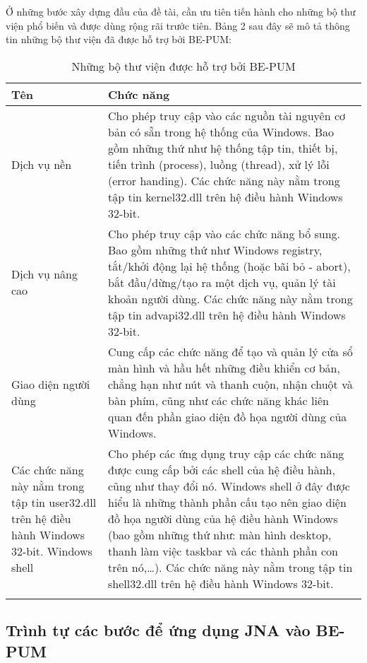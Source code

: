Ở những bước xây dựng đầu của đề tài, cần ưu tiên tiến hành cho những bộ thư viện phổ biến và được dùng rộng rãi trước tiên. Bảng 2 sau đây sẽ mô tả thông tin những bộ thư viện đã được hỗ trợ bởi BE-PUM:


\begin{longtable}{ | m{3cm} | m{12cm} | }
	\hline
Tên & Chức năng\\
	\hline
	\hline
Dịch vụ nền & Cho phép truy cập vào các nguồn tài nguyên cơ bản có sẵn trong hệ thống của Windows. Bao gồm những thứ như hệ thống tập tin, thiết bị, tiến trình (process), luồng (thread), xử lý lỗi (error handing).
Các chức năng này nằm trong tập tin kernel32.dll trên hệ điều hành Windows 32-bit.\\
	\hline
Dịch vụ nâng cao & Cho phép truy cập vào các chức năng bổ sung. Bao gồm những thứ như Windows registry, tắt/khởi động lại hệ thống (hoặc bãi bỏ - abort), bắt đầu/dừng/tạo ra một dịch vụ, quản lý tài khoản người dùng.
Các chức năng này nằm trong tập tin advapi32.dll trên hệ điều hành Windows 32-bit.\\
	\hline
Giao diện người dùng & Cung cấp các chức năng để tạo và quản lý cửa sổ màn hình và hầu hết những điều khiển cơ bản, chẳng hạn như nút và thanh cuộn, nhận chuột và bàn phím, cũng như các chức năng khác liên quan đến phần giao diện đồ họa người dùng của Windows.\\
	\hline
Các chức năng này nằm trong tập tin user32.dll trên hệ điều hành Windows 32-bit.
Windows shell & Cho phép các ứng dụng truy cập các chức năng được cung cấp bởi các shell của hệ điều hành, cũng như thay đổi nó.
Windows shell ở đây được hiểu là những thành phần cấu tạo nên giao diện đồ họa người dùng của hệ điều hành Windows (bao gồm những thứ như: màn hình desktop, thanh làm việc taskbar và các thành phần con trên nó,…).
Các chức năng này nằm trong tập tin shell32.dll trên hệ điều hành Windows 32-bit.\\
	\hline

\caption[Những bộ thư viện được hỗ trợ bởi BE-PUM]{Những bộ thư viện được hỗ trợ bởi BE-PUM}
\label{table:tblwapilib}
\end{longtable}


	\subsection{Trình tự các bước để ứng dụng JNA vào BE-PUM}

